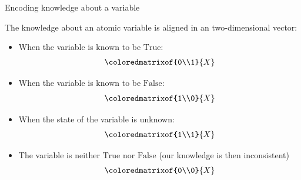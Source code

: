 \documentclass{beamer}
\begin{document}
    \begin{frame}{Encoding knowledge about a variable}

        The knowledge about an atomic variable is aligned in an two-dimensional vector:
        \begin{itemize}
            \item When the variable is known to be $\mathrm{True}$:
            \begin{align*}
                \coloredmatrixof{0\\1}{\catvariable}
            \end{align*}
            \item When the variable is known to be $\mathrm{False}$:
            \begin{align*}
                \coloredmatrixof{1\\0}{\catvariable}
            \end{align*}
            \item When the state of the variable is unknown:
            \begin{align*}
                \coloredmatrixof{1\\1}{\catvariable}
            \end{align*}
            \item The variable is neither $\mathrm{True}$ nor $\mathrm{False}$ (our knowledge is then inconsistent)
            \begin{align*}
                \coloredmatrixof{0\\0}{\catvariable}
            \end{align*}
        \end{itemize}

    \end{frame}
\end{document}
